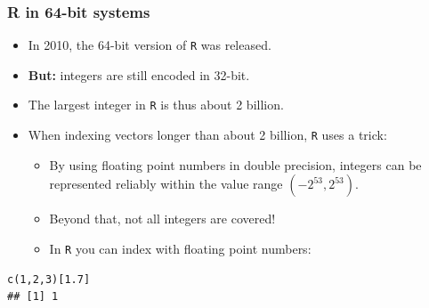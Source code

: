 \documentclass[11pt,compress,t,notes=noshow, xcolor=table]{beamer}
\begin{document}
\begin{vbframe}
\frametitle{R in 64-bit systems}
\begin{itemize}
  \item In 2010, the 64-bit version of \texttt{R} was released.
  \item \textbf{But:} integers are still encoded in 32-bit.
  \item The largest integer in \texttt{R} is thus about 2 billion.
  \item When indexing vectors longer than about 2 billion, \texttt{R} uses a trick:
  \begin{itemize}
    \item By using floating point numbers in double precision, integers can be represented reliably within the value range $(-2^{53}, 2^{53})$.
    \item Beyond that, not all integers are covered!
    \item In \texttt{R} you can index with floating point numbers:
  \end{itemize}
\end{itemize}

\footnotesize
\lz
\begin{verbatim}
c(1,2,3)[1.7]
## [1] 1
\end{verbatim}

\end{vbframe}

\endlecture
\end{document}
